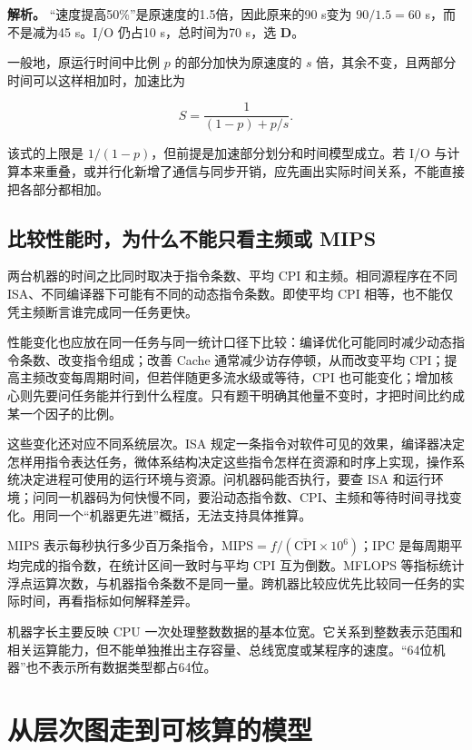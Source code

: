 \textbf{解析。} ``速度提高50\%''是原速度的1.5倍，因此原来的90 s变为 \(90/1.5=60\) s，而不是减为45 s。I/O 仍占10 s，总时间为70 s，选 \textbf{D}。

一般地，原运行时间中比例 \(p\) 的部分加快为原速度的 \(s\) 倍，其余不变，且两部分时间可以这样相加时，加速比为

\[
S=\frac{1}{(1-p)+p/s}.
\]

该式的上限是 \(1/(1-p)\)，但前提是加速部分划分和时间模型成立。若 I/O 与计算本来重叠，或并行化新增了通信与同步开销，应先画出实际时间关系，不能直接把各部分都相加。

\subsection{比较性能时，为什么不能只看主频或 MIPS}\label{CO01-10}

两台机器的时间之比同时取决于指令条数、平均 CPI 和主频。相同源程序在不同 ISA、不同编译器下可能有不同的动态指令条数。即使平均 CPI 相等，也不能仅凭主频断言谁完成同一任务更快。

性能变化也应放在同一任务与同一统计口径下比较：编译优化可能同时减少动态指令条数、改变指令组成；改善 Cache 通常减少访存停顿，从而改变平均 CPI；提高主频改变每周期时间，但若伴随更多流水级或等待，CPI 也可能变化；增加核心则先要问任务能并行到什么程度。只有题干明确其他量不变时，才把时间比约成某一个因子的比例。

这些变化还对应不同系统层次。ISA 规定一条指令对软件可见的效果，编译器决定怎样用指令表达任务，微体系结构决定这些指令怎样在资源和时序上实现，操作系统决定进程可使用的运行环境与资源。问机器码能否执行，要查 ISA 和运行环境；问同一机器码为何快慢不同，要沿动态指令数、CPI、主频和等待时间寻找变化。用同一个``机器更先进''概括，无法支持具体推算。

MIPS 表示每秒执行多少百万条指令，\(\mathrm{MIPS}=f/(\overline{\mathrm{CPI}}\times10^6)\)；IPC 是每周期平均完成的指令数，在统计区间一致时与平均 CPI 互为倒数。MFLOPS 等指标统计浮点运算次数，与机器指令条数不是同一量。跨机器比较应优先比较同一任务的实际时间，再看指标如何解释差异。

机器字长主要反映 CPU 一次处理整数数据的基本位宽。它关系到整数表示范围和相关运算能力，但不能单独推出主存容量、总线宽度或某程序的速度。``64位机器''也不表示所有数据类型都占64位。

\section{从层次图走到可核算的模型}\label{CO01-model}

